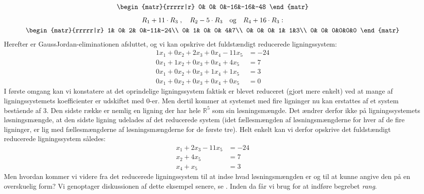 \begin{example}
\begin{equation}
\begin{gathered}
\begin{matr}{rrrrr|r}
 0& 0& 0&-16&-16&-48
\end{matr}
\end{gathered}
\end{equation}
\begin{equation} \label{TN2.10}
\begin{gathered}
R_1+11\cdot R_3 \; , \quad R_2-5\cdot R_3 \quad \mathrm{og} \quad R_4+16\cdot R_3:  \\
\begin{matr}{rrrrr|r}
 1& 0& 2& 0&-11&-24\\
 0& 1& 0& 0& 4&7\\
 0& 0& 0& 1& 1&3\\
 0& 0& 0&0&0&0
\end{matr}
\end{gathered}
\end{equation}
Herefter er GaussJordan-eliminationen afsluttet, og vi kan opskrive det fuldstændigt reducerede ligningssystem:
\begin{equation}
\begin{aligned}
1x_1+0x_2+2x_3+0x_4-11x_5&=-24\\
0x_1+1x_2+0x_3+0x_4+4x_5&=7\\
0x_1+0x_2+0x_3+1x_4+1x_5&=3\\
0x_1+0x_2+0x_3+0x_4+0x_5&=0
\end{aligned}
\end{equation}
I første omgang kan vi konstatere at det oprindelige ligningssystem faktisk er blevet reduceret (gjort mere enkelt) ved at mange af ligningssystemets koefficienter er udskiftet med $0$-er. Men dertil kommer at systemet med fire ligninger nu kan erstattes af et system bestående af 3. Den sidste række er nemlig en  ligning der har hele $\mathbb R^5$ som sin løsningsmængde. Det ændrer derfor ikke på ligningssystemets løsningsmængde, at den sidste ligning udelades af det reducerede system (idet fællesmængden af løsningsmængderne for hver af de fire ligninger, er lig med fællesmængderne af løsningsmængderne for de første tre). Helt enkelt kan vi derfor opskrive det fuldstændigt reducerede ligningssystem således:
\begin{equation}\label{TN2.11a}
\begin{aligned}
x_1+2x_3-11x_5&=-24\\
x_2+4x_5&=7\\
x_4+x_5&=3
\end{aligned}
\end{equation}
Men hvordan kommer vi videre fra det reducerede ligningssystem til at indse hvad løsningsmængden er og til at kunne angive den på en overskuelig form? Vi genoptager diskussionen af dette eksempel senere, se . Inden da får vi brug for at indføre begrebet \textit{rang}.
\end{example}

